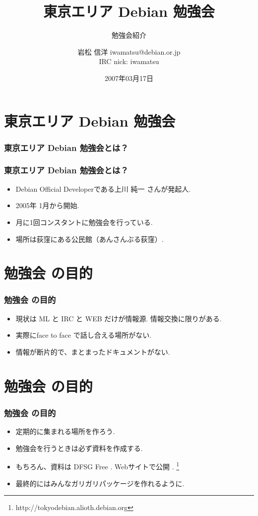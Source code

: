 \documentclass[cjk,dvipdfmx]{beamer}
\title{東京エリア Debian 勉強会}
\subtitle{勉強会紹介}
\author{岩松 信洋 iwamatsu@debian.or.jp\\IRC nick: iwamatsu}
\date{2007年03月17日}
\begin{document}
\frame{\titlepage{}}

\section{東京エリア Debian 勉強会}

\begin{frame}
 \frametitle{東京エリア Debian 勉強会とは？}
\end{frame}

\begin{frame}
 \frametitle{東京エリア Debian 勉強会とは？}
\begin{itemize}
  \item<1-> Debian Official Developerである上川 純一 さんが発起人.
  \item<2-> 2005年 1月から開始.
  \item<3-> 月に1回コンスタントに勉強会を行っている.
  \item<4-> 場所は荻窪にある公民館（あんさんぶる荻窪）.
\end{itemize}
\end{frame}

\section{勉強会 の目的}

\begin{frame}
 \frametitle{勉強会 の目的}
\begin{itemize}
  \item<1-> 現状は ML と IRC と WEB だけが情報源. 情報交換に限りがある.
  \item<2-> 実際にface to face で話し合える場所がない.
  \item<3-> 情報が断片的で、まとまったドキュメントがない.
\end{itemize}
\end{frame}

\section{勉強会 の目的}
\begin{frame}
 \frametitle{勉強会 の目的}
\begin{itemize}
  \item<1-> 定期的に集まれる場所を作ろう.
  \item<2-> 勉強会を行うときは必ず資料を作成する.
  \item<3-> もちろん、資料は DFSG Free . Webサイトで公開 .
\footnote{http://tokyodebian.alioth.debian.org}
  \item<4-> 最終的にはみんなガリガリパッケージを作れるように.
\end{itemize}
\end{frame}
\end{document}
